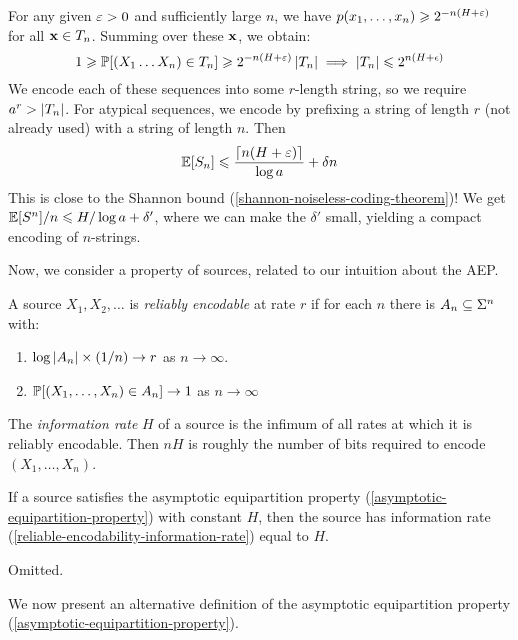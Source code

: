 \documentclass{article}
\begin{document}
\begin{remark}
	For any given $\eps > 0$ and sufficiently large $n$,
	we have $p(x_1, \dots, x_n) \geq 2^{-n(H+\eps)}$
	for all $\x \in T_n$.
	Summing over these $\x$, we obtain:
	\[
	1 \geq \P[(X_1 \dots X_n) \in T_n] \geq
	2^{-n(H+\eps)} \abs{T_n}
	\implies
	\abs{T_n} \leq 2^{n(H+\epsilon)}
	\]
	We encode each of these sequences into some $r$-length string,
	so we require $a^r > \abs{T_n}$.
	For atypical sequences,
	we encode by prefixing a string of length $r$ (not already used)
	with a string of length $n$. Then
	\[
	\E[S_n] \leq \frac{\ceil{n(H+\eps)}}{\log a} + \delta n
	\]
	This is close to the Shannon bound (\ref{shannon-noiseless-coding-theorem})!
	We get $\E[S^n]/n \leq H/\log a + \delta'$,
	where we can make the $\delta'$ small,
	yielding a compact encoding of $n$-strings.
\end{remark}

Now, we consider a property of sources, related to our intuition about the AEP.

\begin{definition}
	\label{reliable-encodability-information-rate}
    A source $X_1, X_2, \dots$ is \textit{reliably encodable}
    at rate $r$ if for each $n$ there is $A_n \subs \Sigma^n$ with:
    
    \begin{enumerate}
    	\item $\log \abs{A_n} \times (1/n) \to r$ as $n \to \infty$.
    	\item $\P[(X_1, \dots, X_n) \in A_n] \to 1$ as $n \to \infty$
	\end{enumerate}
	
	The \textit{information rate} $H$ of a source
	is the infimum of all rates at which it is reliably encodable.
	Then $nH$ is roughly the number of bits required to encode $(X_1, \dots, X_n)$.
\end{definition}

\begin{theorem}
    If a source satisfies the asymptotic equipartition property
    (\ref{asymptotic-equipartition-property})
    with constant $H$,
    then the source has information rate
    (\ref{reliable-encodability-information-rate})
    equal to $H$.
\end{theorem}
\begin{prf}
    Omitted.
\end{prf}

We now present an alternative definition
of the asymptotic equipartition property
(\ref{asymptotic-equipartition-property}).
\end{document}
